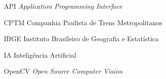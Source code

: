 \begin{siglas}
    \item[API] \textit{Application Programming Interface}
	\item[CPTM] {Companhia Paulista de Trens Metropolitanos}
	\item[IBGE] {Instituto Brasileiro de Geografia e Estatística}
	\item[IA]  {Inteligência Artificial}
	\item[OpenCV] \textit{Open Source Computer Vision}

\end{siglas}
